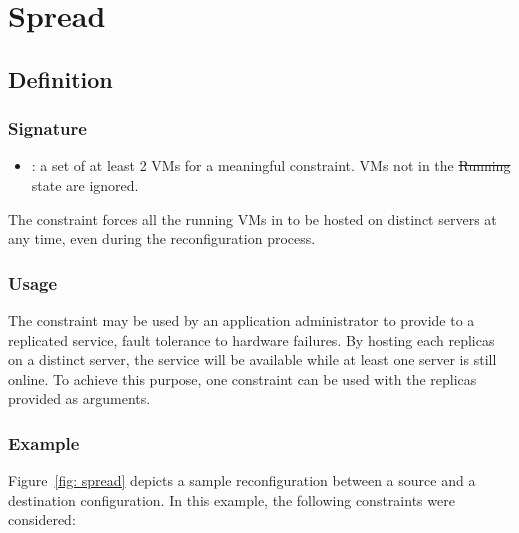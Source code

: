 \section{Spread}

\subsection{Definition}

\subsubsection{Signature} 

\begin{itemize}
\item {} : a set of at least 2 VMs for a meaningful constraint. VMs not in the \st{Running} state are ignored.
\end{itemize}

The  constraint forces all the running VMs in  to be hosted
on distinct servers at any time, even during the reconfiguration process.


\subsubsection{Usage}

The  constraint may be used by an application administrator to provide to a replicated service,
fault tolerance to hardware failures. By hosting each replicas on a distinct server, the service will  be
available while at least one server is still online. To achieve this purpose, one  constraint can
be used with the replicas provided as arguments.


\subsubsection{Example}

Figure~\ref{fig: spread} depicts a sample reconfiguration between a source and a destination
configuration. In this example, the following  constraints were considered:


